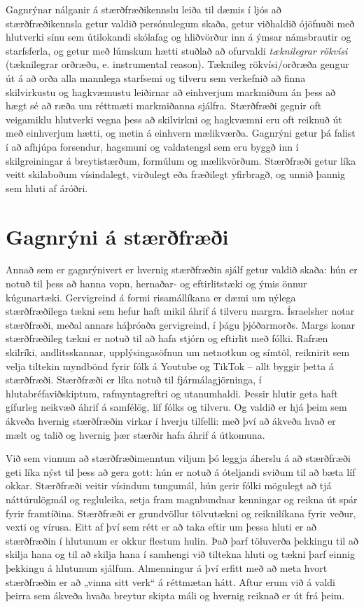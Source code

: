 \documentclass[
  icelandic,
]{book}
\begin{document}
Gagnrýnar nálganir á stærðfræðikennslu leiða til dæmis í ljós að stærðfræðikennsla getur valdið persónulegum skaða, getur viðhaldið ójöfnuði með hlutverki sínu sem útilokandi skólafag og hliðvörður inn á ýmsar námsbrautir og starfsferla, og getur með lúmskum hætti stuðlað að ofurvaldi \emph{tæknilegrar rökvísi} (tæknilegrar orðræðu, e. instrumental reason). Tæknileg rökvísi/orðræða gengur út á að orða alla mannlega starfsemi og tilveru sem verkefnið að finna skilvirkustu og hagkvæmustu leiðirnar að einhverjum markmiðum án þess að hægt sé að ræða um réttmæti markmiðanna sjálfra. Stærðfræði gegnir oft veigamiklu hlutverki vegna þess að skilvirkni og hagkvæmni eru oft reiknuð út með einhverjum hætti, og metin á einhvern mælikværða. Gagnrýni getur þá falist í að afhjúpa forsendur, hagsmuni og valdatengsl sem eru byggð inn í skilgreiningar á breytistærðum, formúlum og mælikvörðum. Stærðfræði getur líka veitt skilaboðum vísindalegt, virðulegt eða fræðilegt yfirbragð, og unnið þannig sem hluti af áróðri.

\section{Gagnrýni á stærðfræði}\label{gagnryni_a_stae}

Annað sem er gagnrýnivert er hvernig stærðfræðin sjálf getur valdið skaða: hún er notuð til þess að hanna vopn, hernaðar- og eftirlitstæki og ýmis önnur kúgunartæki. Gervigreind á formi risamállíkana er dæmi um nýlega stærðfræðilega tækni sem hefur haft mikil áhrif á tilveru margra. Ísraelsher notar stærðfræði, meðal annars háþróaða gervigreind, í þágu þjóðarmorðs. Margs konar stærðfræðileg tækni er notuð til að hafa stjórn og eftirlit með fólki. Rafræn skilríki, andlitsskannar, upplýsingasöfnun um netnotkun og símtöl, reiknirit sem velja tiltekin myndbönd fyrir fólk á Youtube og TikTok -- allt byggir þetta á stærðfræði. Stærðfræði er líka notuð til fjármálagjörninga, í hlutabréfaviðskiptum, rafmyntagreftri og utanumhaldi. Þessir hlutir geta haft gífurleg neikvæð áhrif á samfélög, líf fólks og tilveru. Og valdið er hjá þeim sem ákveða hvernig stærðfræðin virkar í hverju tilfelli: með því að ákveða hvað er mælt og talið og hvernig þær stærðir hafa áhrif á útkomuna.

Við sem vinnum að stærðfræðimenntun viljum þó leggja áherslu á að stærðfræði geti líka nýst til þess að gera gott: hún er notuð á óteljandi sviðum til að bæta líf okkar. Stærðfræði veitir vísindum tungumál, hún gerir fólki mögulegt að tjá náttúrulögmál og regluleika, setja fram magnbundnar kenningar og reikna út spár fyrir framtíðina. Stærðfræði er grundvöllur tölvutækni og reiknilíkana fyrir veður, vexti og vírusa. Eitt af því sem rétt er að taka eftir um þessa hluti er að stærðfræðin í hlutunum er okkur flestum hulin. Það þarf töluverða þekkingu til að skilja hana og til að skilja hana í samhengi við tiltekna hluti og tækni þarf einnig þekkingu á hlutunum sjálfum. Almenningur á því erfitt með að meta hvort stærðfræðin er að „vinna sitt verk`` á réttmætan hátt. Aftur erum við á valdi þeirra sem ákveða hvaða breytur skipta máli og hvernig reiknað er út frá þeim.
\end{document}
